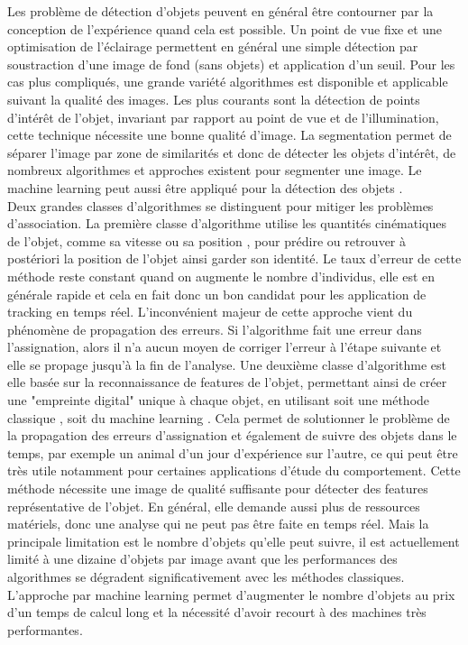   Les problème de détection d'objets peuvent en général être contourner par la conception de l'expérience quand cela est possible. Un point de vue fixe et une optimisation de l'éclairage permettent en général une simple détection par soustraction d'une image de fond (sans objets) et application d'un seuil. Pour les cas plus compliqués, une grande variété algorithmes est disponible \cite{yilmaz2006object} et applicable suivant la qualité des images. Les plus courants sont la détection de points d’intérêt de l'objet, invariant par rapport au point de vue et de l'illumination, cette technique nécessite une bonne qualité d'image. La segmentation permet de séparer l'image par zone de similarités et donc de détecter les objets d’intérêt, de nombreux algorithmes et approches existent pour segmenter une image. Le machine learning peut aussi être appliqué pour la détection des objets \cite{zhao2019object}.\\

  Deux grandes classes d’algorithmes se distinguent pour mitiger les problèmes d'association. La première classe d’algorithme utilise les quantités cinématiques de l'objet, comme sa vitesse ou sa position \cite{rodriguez2017toxid, qian2016effective}, pour prédire ou retrouver à postériori la position de l'objet ainsi garder son identité. Le taux d'erreur de cette méthode reste constant quand on augmente le nombre d'individus, elle est en générale rapide et cela en fait donc un bon candidat pour les application de tracking en temps réel. L’inconvénient majeur de cette approche vient du phénomène de propagation des erreurs. Si l'algorithme fait une erreur dans l'assignation, alors il n'a aucun moyen de corriger l'erreur à l'étape suivante et elle se propage jusqu'à la fin de l'analyse.
  Une deuxième classe d’algorithme est elle basée sur la reconnaissance de features de l'objet, permettant ainsi de créer une "empreinte digital" unique à chaque objet, en utilisant soit une méthode classique \cite{perez2014idtracker, bai2018automatic}, soit du machine learning \cite{mathis2018deeplabcut, romero2019idtracker}. Cela permet de solutionner le problème de la propagation des erreurs d'assignation et également de suivre des objets dans le temps, par exemple un animal d'un jour d'expérience sur l'autre, ce qui peut être très utile notamment pour certaines applications d'étude du comportement. Cette méthode nécessite une image de qualité suffisante pour détecter des features représentative de l'objet. En général, elle demande aussi plus de ressources matériels, donc une analyse qui ne peut pas être faite en temps réel. Mais la principale limitation est le nombre d'objets qu'elle peut suivre, il est actuellement limité à une dizaine d'objets par image avant que les performances des algorithmes se dégradent significativement avec les méthodes classiques. L'approche par machine learning permet d'augmenter le nombre d'objets au prix d'un temps de calcul long et la nécessité d'avoir recourt à des machines très performantes.
	
